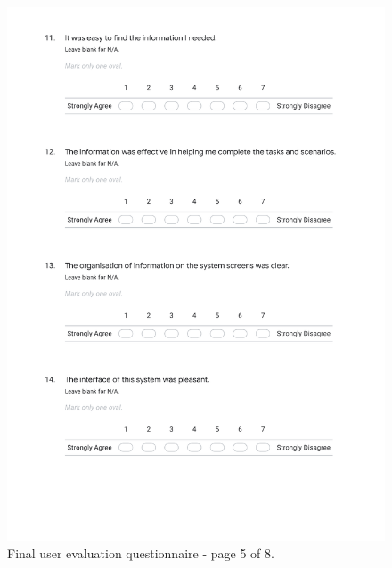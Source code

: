 \documentclass{l4proj}
\begin{document}
\begin{appendices}
\begin{figure}[htb]
    \centering
    \includegraphics[width=\linewidth]{images/final_evaluation_5.pdf}    
    \caption{Final user evaluation questionnaire - page 5 of 8.}
    \label{fig:final_evaluation_5} 
\end{figure}


\end{appendices}
\end{document}
